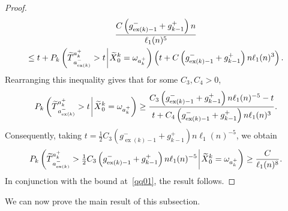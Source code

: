 \documentclass[10pt]{amsart}
\theoremstyle{definition}\newtheorem{defi}[theo]{Definition}\newtheorem{rema}[theo]{Remark}\newtheorem{exam}[theo]{Example}\newtheorem{exem}[theo]{Example}\newtheorem{nota}[theo]{Notation}
\newcommand{\Pk}{{P_k}}
\newcommand\ex{\operatorname{ex}}
\newcommand{\aat}[1]{a_{\ex(#1)}^-}
\newcommand{\gtt}[1]{g_{\ex(#1)-1}^-}
\let\oldtilde\tilde
\renewcommand*{\tilde}[1]{\mathchoice{\widetilde{#1}}{\widetilde{#1}}{\oldtilde{#1}}{\oldtilde{#1}}}
\begin{document}
\begin{proof}
\begin{multline*}
\frac{C\left(\gtt{k}+g_{k-1}^+\right)n}{\ell_1(n)^5}\\
\leq t+\Pk\left(\tilde{T}_{\aat{k}}^{a_k^+}>t\:\vline\:\tilde{X}^k_0=\omega_{a_k^+}\right)\left(t+C\left(\gtt{k}+g_{k-1}^+\right)n\ell_1(n)^3\right).
\end{multline*}
Rearranging this inequality gives that for some $C_3, C_4>0$,
\[
\Pk\left(\tilde{T}_{{\aat{k}}}^{{a_k^+}}>t\:\vline\:\tilde{X}^k_0=\omega_{a_k^+}\right)\geq
\frac{C_3\left(\gtt{k}+g_{k-1}^+\right)n \ell_1(n)^{-5}-t}{t+C_4\left(\gtt{k}+g_{k-1}^+\right)n\ell_1(n)^3}.
\]
Consequently, taking $t=\tfrac{1}{2}C_3(\gtt{k}+g_{k-1}^+)n \ell_1(n)^{-5}$, we obtain
\[
\Pk\left(\tilde{T}_{{\aat{k}}}^{{a_k^+}}>\tfrac{1}{2}C_3\left(\gtt{k}+g_{k-1}^+\right)n \ell_1(n)^{-5}\:\vline\:\tilde{X}^k_0=\omega_{a_k^+}\right)\geq \frac{C}{\ell_1(n)^{8}}.
\]
In conjunction with the bound at~\eqref{qq01}, the result follows.
\end{proof}

We can now prove the main result of this subsection.
\end{document}
